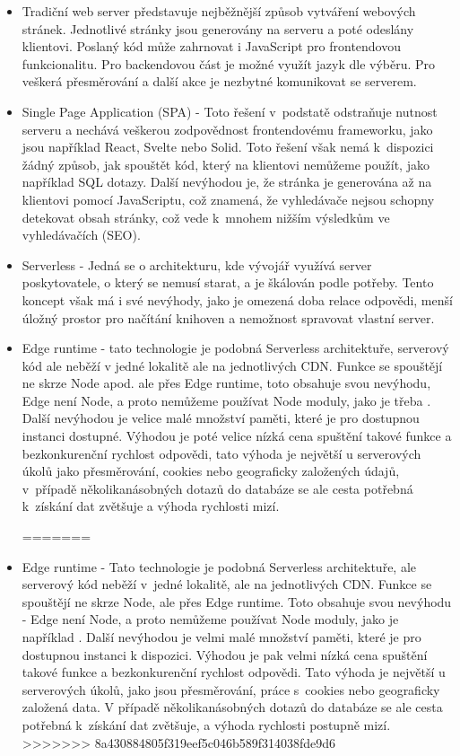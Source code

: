 \documentclass[12pt, a4paper,
openright
]{report}
\begin{document}
\begin{itemize}
\item Tradiční web server představuje nejběžnější způsob vytváření webových stránek. Jednotlivé stránky jsou generovány na serveru a poté odeslány klientovi. Poslaný kód může zahrnovat i JavaScript pro frontendovou funkcionalitu. Pro backendovou část je možné využít jazyk dle výběru. Pro veškerá přesměrování a další akce je nezbytné komunikovat se serverem.

\item Single Page Application (SPA) - Toto řešení v~podstatě odstraňuje nutnost serveru a nechává veškerou zodpovědnost frontendovému frameworku, jako jsou například React, Svelte nebo Solid. Toto řešení však nemá k~dispozici žádný způsob, jak spouštět kód, který na klientovi nemůžeme použít, jako například SQL dotazy. Další nevýhodou je, že stránka je generována až na klientovi pomocí JavaScriptu, což znamená, že vyhledávače nejsou schopny detekovat obsah stránky, což vede k~mnohem nižším výsledkům ve vyhledávačích (SEO).

\item Serverless - Jedná se o architekturu, kde vývojář využívá server poskytovatele, o který se nemusí starat, a je škálován podle potřeby. Tento koncept však má i své nevýhody, jako je omezená doba relace odpovědi, menší úložný prostor pro načítání knihoven a nemožnost spravovat vlastní server.

\item Edge runtime - tato technologie je podobná Serverless architektuře, serverový kód ale neběží v jedné lokalitě ale na jednotlivých CDN. Funkce se spouštějí ne skrze Node apod. ale přes Edge runtime, toto obsahuje svou nevýhodu, Edge není Node, a proto nemůžeme používat Node moduly, jako je třeba . Další nevýhodou je velice malé množství paměti, které je pro dostupnou instanci dostupné. Výhodou je poté velice nízká cena spuštění takové funkce a bezkonkurenční rychlost odpovědi, tato výhoda je největší u serverových úkolů jako přesměrování, cookies nebo geograficky založených údajů, v~případě několikanásobných dotazů do databáze se ale cesta potřebná k~získání dat zvětšuje a výhoda rychlosti mizí.

=======
\item Edge runtime - Tato technologie je podobná Serverless architektuře, ale serverový kód neběží v~jedné lokalitě, ale na jednotlivých CDN. Funkce se spouštějí ne skrze Node, ale přes Edge runtime. Toto obsahuje svou nevýhodu - Edge není Node, a proto nemůžeme používat Node moduly, jako je například . Další nevýhodou je velmi malé množství paměti, které je pro dostupnou instanci k dispozici. Výhodou je pak velmi nízká cena spuštění takové funkce a bezkonkurenční rychlost odpovědi. Tato výhoda je největší u serverových úkolů, jako jsou přesměrování, práce s~cookies nebo geograficky založená data. V případě několikanásobných dotazů do databáze se ale cesta potřebná k~získání dat zvětšuje, a výhoda rychlosti postupně mizí.
>>>>>>> 8a430884805f319eef5c046b589f314038fde9d6


\end{itemize}
\end{document}
